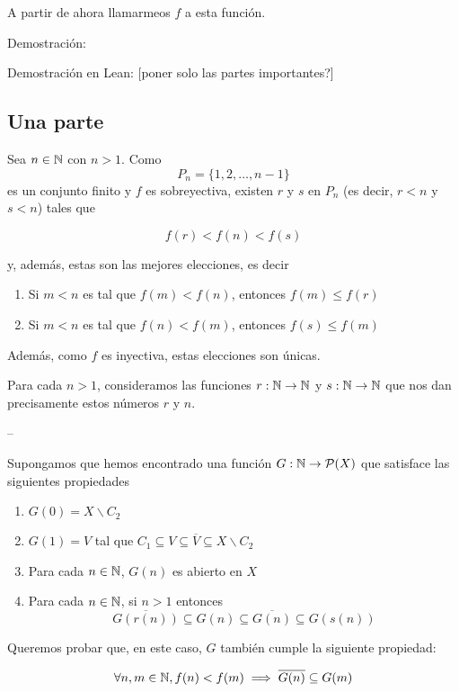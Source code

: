 A partir de ahora llamarmeos $f$ a esta función.

Demostración:

Demostración en Lean: [poner solo las partes importantes?]

\subsection{Una parte}

Sea $n \in \mathbb{N}$ con $n > 1$. Como $$P_n = \{1, 2, \dots, n-1\}$$ es un conjunto finito y $f$ es sobreyectiva, existen $r$ y $s$ en $P_n$ (es decir, $r < n$ y $s < n$) tales que

\begin{equation} \label{cond_rs}
  f(r) < f(n) < f(s)
\end{equation}

y, además, estas son las mejores elecciones, es decir

\begin{enumerate}
  \item Si $m < n$ es tal que $f(m) < f(n)$, entonces $f(m) \leq f(r)$
  \item Si $m < n$ es tal que $f(n) < f(m)$, entonces $f(s) \leq f(m)$
\end{enumerate}

Además, como $f$ es inyectiva, estas elecciones son únicas.

Para cada $n > 1$, consideramos las funciones $r : \mathbb{N} \to \mathbb{N}$ y $s : \mathbb{N} \to \mathbb{N}$ que nos dan precisamente estos números $r$ y $n$.

--

Supongamos que hemos encontrado una función $G : \mathbb{N} \to \mathcal{P}(X)$ que satisface las siguientes propiedades

\begin{enumerate}
  \item $G(0) = X \backslash C_2$
  \item $G(1) = V$ tal que $C_1 \subseteq V \subseteq \overline{V} \subseteq X \backslash C_2$
  \item Para cada $n \in \mathbb{N} $, $G(n)$ es abierto en $X$
  \item Para cada $n \in \mathbb{N}$, si $n>1$ entonces \begin{equation} \label{cond_Grs} \overline{G(r(n))} \subseteq G(n) \subseteq \overline{G(n)} \subseteq G(s(n)) \end{equation}
\end{enumerate}

Queremos probar que, en este caso, $G$ también cumple la siguiente propiedad:

\begin{equation} \label{cond_G}
  \forall n, m \in \mathbb{N}, f(n) < f(m) \implies \overline{G(n)} \subseteq G(m)
\end{equation}